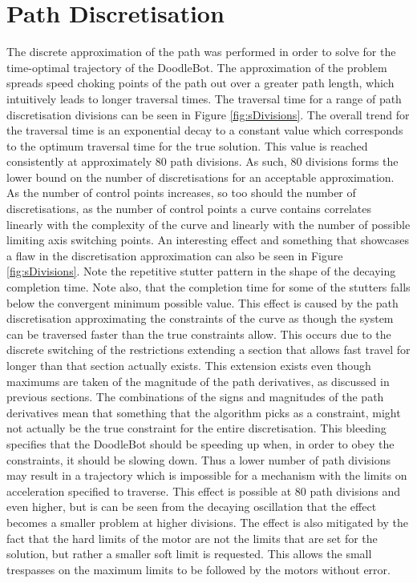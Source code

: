 \section{Path Discretisation}
The discrete approximation of the path was performed in order to solve for the time-optimal trajectory of the DoodleBot. The approximation of the problem spreads speed choking points of the path out over a greater path length, which intuitively leads to longer traversal times. The traversal time for a range of path discretisation divisions can be seen in Figure \ref{fig:sDivisions}. The overall trend for the traversal time is an exponential decay to a constant value which corresponds to the optimum traversal time for the true solution. This value is reached consistently at approximately 80 path divisions. As such, 80 divisions forms the lower bound on the number of discretisations for an acceptable approximation. As the number of control points increases, so too should the number of discretisations, as the number of control points a curve contains correlates linearly with the complexity of the curve and linearly with the number of possible limiting axis switching points.
An interesting effect and something that showcases a flaw in the discretisation approximation can also be seen in Figure \ref{fig:sDivisions}. Note the repetitive stutter pattern in the shape of the decaying completion time. Note also, that the completion time for some of the stutters falls below the convergent minimum possible value. This effect is caused by the path discretisation approximating the constraints of the curve as though the system can be traversed faster than the true constraints allow. This occurs due to the discrete switching of the restrictions extending a section that allows fast travel for longer than that section actually exists. This extension exists even though maximums are taken of the magnitude of the path derivatives, as discussed in previous sections. The combinations of the signs and magnitudes of the path derivatives mean that something that the algorithm picks as a constraint, might not actually be the true constraint for the entire discretisation. This bleeding specifies that the DoodleBot should be speeding up when, in order to obey the constraints, it should be slowing down. Thus a lower number of path divisions may result in a trajectory which is impossible for a mechanism with the limits on acceleration specified to traverse. This effect is possible at 80 path divisions and even higher, but is can be seen from the decaying oscillation that the effect becomes a smaller problem at higher divisions. The effect is also mitigated by the fact that the hard limits of the motor are not the limits that are set for the solution, but rather a smaller soft limit is requested. This allows the small trespasses on the maximum limits to be followed by the motors without error.


